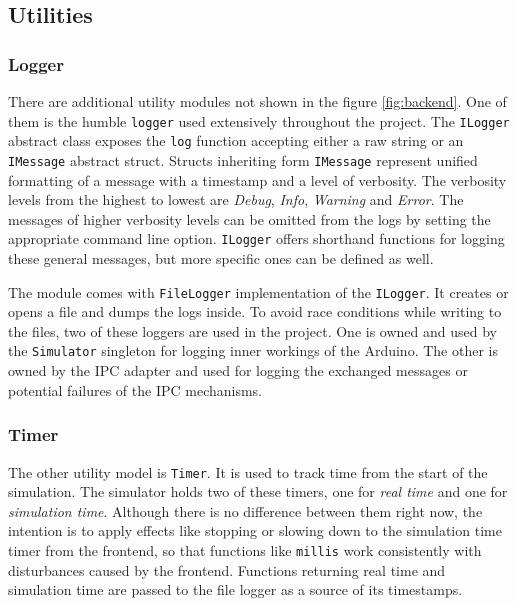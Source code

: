 \subsection{Utilities}

\subsubsection{Logger} \label{subsub:logger}

There are additional utility modules not shown in the figure \ref{fig:backend}. One of them is the humble \texttt{logger} used extensively throughout the project. The \texttt{ILogger} abstract class exposes the \texttt{log} function accepting either a raw string or an \texttt{IMessage} abstract struct. Structs inheriting form \texttt{IMessage} represent unified formatting of a message with a timestamp and a level of verbosity. The verbosity levels from the highest to lowest are \textit{Debug}, \textit{Info}, \textit{Warning} and \textit{Error}. The messages of higher verbosity levels can be omitted from the logs by setting the appropriate command line option. \texttt{ILogger} offers shorthand functions for logging these general messages, but more specific ones can be defined as well.

The module comes with \texttt{FileLogger} implementation of the \texttt{ILogger}. It creates or opens a file and dumps the logs inside. To avoid race conditions while writing to the files, two of these loggers are used in the project. One is owned and used by the \texttt{Simulator} singleton for logging inner workings of the Arduino. The other is owned by the IPC adapter and used for logging the exchanged messages or potential failures of the IPC mechanisms.

\subsubsection{Timer}

The other utility model is \texttt{Timer}. It is used to track time from the start of the simulation. The simulator holds two of these timers, one for \textit{real time} and one for \textit{simulation time}. Although there is no difference between them right now, the intention is to apply effects like stopping or slowing down to the simulation time timer from the frontend, so that functions like \texttt{millis} work consistently with disturbances caused by the frontend. Functions returning real time and simulation time are passed to the file logger as a source of its timestamps.


